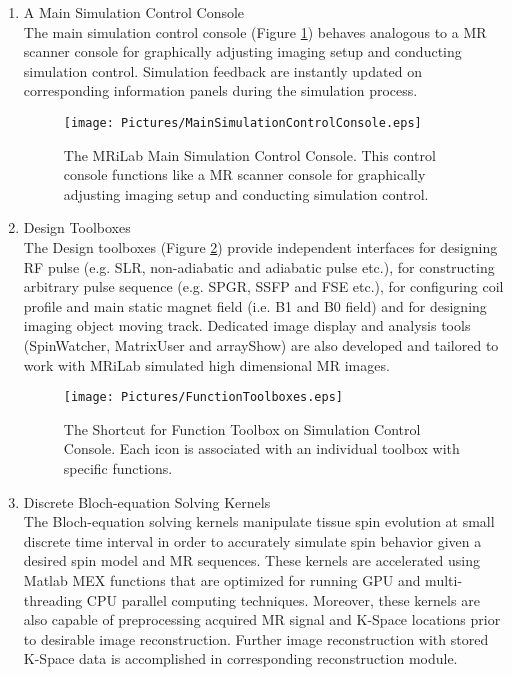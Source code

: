 \documentclass{book}%
\begin{document}
\begin{enumerate}
\item A Main Simulation Control Console \\
The main simulation control console (Figure \ref{fig:MainSimulationControlConsole}) behaves analogous to a MR scanner console for graphically adjusting imaging setup and conducting simulation control. Simulation feedback are instantly updated on corresponding information panels during the simulation process.

\begin{figure}[htbp]
	\centering
		\texttt{[image: Pictures/MainSimulationControlConsole.eps]}
	\caption{The MRiLab Main Simulation Control Console. This control console functions like a MR scanner console for graphically adjusting imaging setup and conducting simulation control.}
	\label{fig:MainSimulationControlConsole}
\end{figure}


\item Design Toolboxes \\
The Design toolboxes (Figure \ref{fig:FunctionToolboxes}) provide independent interfaces for designing RF pulse (e.g. SLR, non-adiabatic and adiabatic pulse etc.), for constructing arbitrary pulse sequence (e.g. SPGR, SSFP and FSE etc.), for configuring coil profile and main static magnet field (i.e. B1 and B0 field) and for designing imaging object moving track. Dedicated image display and analysis tools (SpinWatcher, MatrixUser and arrayShow) are also developed and tailored to work with MRiLab simulated high dimensional MR images.


\begin{figure}[htbp]
	\centering
		\texttt{[image: Pictures/FunctionToolboxes.eps]}
	\caption{The Shortcut for Function Toolbox on Simulation Control Console. Each icon is associated with an individual toolbox with specific functions.}
	\label{fig:FunctionToolboxes}
\end{figure}


\item Discrete Bloch-equation Solving Kernels \\
The Bloch-equation solving kernels manipulate tissue spin evolution at small discrete time interval in order to accurately simulate spin behavior given a desired spin model and MR sequences. These kernels are accelerated using Matlab MEX functions that are optimized for running GPU and multi-threading CPU parallel computing techniques. Moreover, these kernels are also capable of preprocessing acquired MR signal and K-Space locations prior to desirable image reconstruction. Further image reconstruction with stored K-Space data is accomplished in corresponding reconstruction module.


\end{enumerate}
\end{document}
